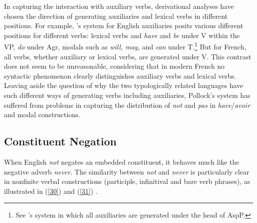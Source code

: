 \documentclass[output=paper
                ,modfonts
                		,nonflat
	        ,collection
	        ,collectionchapter
	        ,collectiontoclongg
 	        ,biblatex
                ,babelshorthands
                ,newtxmath
                ,draftmode
                ,colorlinks, citecolor=brown
]{./langsci/langscibook}
\begin{document}
{\begin{exe}
\begin{xlist}
\begin{exe}
\begin{xlist}
{In capturing the interaction with auxiliary verbs, derivational analyses have chosen the direction of generating
auxiliaries and lexical  verbs in different positions. For example,
\citet{Pollock:89}'s system for English auxiliaries posits
various different positions for different verbs: lexical
verbs and \textit{have} and \textit{be} under V within the VP,
\textit{do} under Agr, modals such as \textit{will, may}, and \textit{can}
under T.\footnote{See \citep{Ouhalla:91}'s system in which
all auxiliaries are generated under the head of AspP.} But for French,
all verbs, whether
auxiliary or lexical  verbs, are generated under V.
This contrast does not seem to be unreasonable, considering that in
modern French no syntactic phenomenon clearly distinguishes auxiliary
verbs and lexical  verbs. Leaving aside the question of why the two
typologically related languages have such different ways of generating
verbs including auxiliaries, Pollock's system has suffered
from problems in capturing the distribution of \textit{not} and
\textit{pas} in \textit{have}/\textit{avoir} and modal constructions.}
\fi

\subsection{Constituent Negation}

When English \textit{not} negates an embedded constituent, it behaves
much like the negative adverb \textit{never}. The similarity between {\it
not} and \textit{never} is particularly clear in nonfinite verbal
constructions (participle, infinitival and bare verb phrases), as
illustrated in (\ref{30}) and (\ref{31}) \citep{Klima:64, Baker:89,Baker:91}.

\eal\label{30}
\zl


\end{xlist}
\end{exe}
\end{xlist}
\end{exe}}
\end{document}

